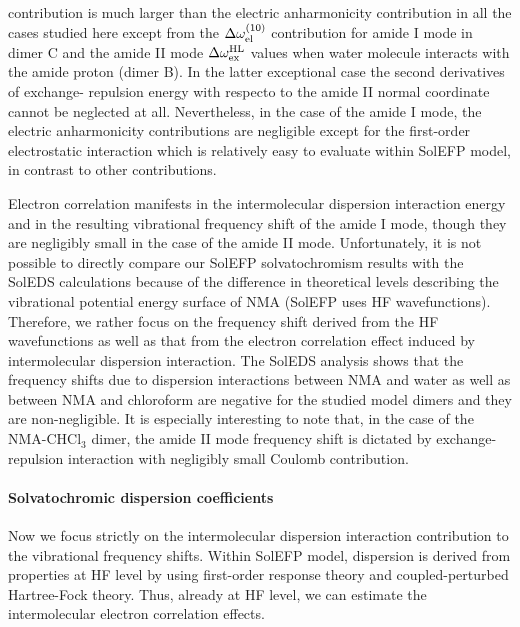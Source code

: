 \documentclass[a4paper,titlepage,twoside,fleqn,12pt]{book}
\begin{document}
\begin{refsection}
contribution is much larger than the electric
anharmonicity contribution in all the cases
studied here except from the $\Delta \omega_{{\rm el}}^{(10)}$ contribution for amide I mode 
in dimer C and the amide II mode
$\Delta \omega_{{\rm ex}}^{\rm HL}$ values when
water molecule interacts with the amide proton
(dimer B).
In the latter exceptional case the second derivatives of exchange\hyp{}
repulsion energy with respecto to the amide II normal coordinate
cannot be neglected at all. 
Nevertheless, in the case of the amide I mode, the
electric anharmonicity contributions are negligible except for
the first\hyp{}order electrostatic interaction
which is relatively easy to evaluate within SolEFP model, in contrast to
other contributions.

Electron correlation manifests in the intermolecular
dispersion interaction energy and in the resulting vibrational
frequency shift of the amide I mode, though they are negligibly
small in the case of the amide II mode. Unfortunately, it is
not possible to directly compare our SolEFP solvatochromism
results with the SolEDS calculations because of the difference
in theoretical levels describing the vibrational potential energy
surface of NMA (SolEFP uses HF wavefunctions). Therefore,
we rather focus on the frequency shift derived from the HF
wavefunctions as well as that from the electron correlation
effect induced by intermolecular dispersion interaction. The
SolEDS analysis shows that the frequency shifts due to dispersion
interactions between NMA and water as well as between
NMA and chloroform are negative for the studied model
dimers and they are non\hyp{}negligible. It is especially interesting
to note that, in the case of the NMA\hyp{}CHCl$_3$ dimer, the amide
II mode frequency shift is dictated by exchange\hyp{}repulsion
interaction with negligibly small Coulomb contribution.

\paragraph{Solvatochromic dispersion coefficients\label{s:nma-sol-disp}}

Now we focus strictly on the intermolecular dispersion
interaction contribution to the vibrational frequency shifts.
Within SolEFP model, dispersion is derived from properties
at HF level by using first\hyp{}order response theory
and coupled\hyp{}perturbed Hartree\hyp{}Fock theory.
Thus, already at HF level, we can estimate the intermolecular
electron correlation effects.


\end{refsection}
\end{document}

